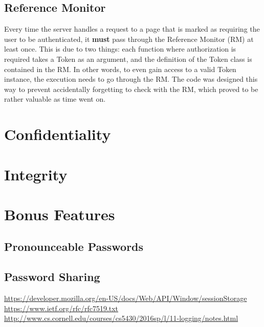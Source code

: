 \documentclass{article}
\begin{document}
\subsection{Reference Monitor}
\par Every time the server handles a request to a page that is marked as requiring the user to be authenticated, it \textbf{must} pass through the Reference Monitor (RM) at least once. This is due to two things: each function where authorization is required takes a Token as an argument, and the definition of the Token class is contained in the RM. In other words, to even gain access to a valid Token instance, the execution needs to go through the RM. The code was designed this way to prevent accidentally forgetting to check with the RM, which proved to be rather valuable as time went on.


\section{Confidentiality}
\section{Integrity}

\section{Bonus Features}

\subsection{Pronounceable Passwords}

\subsection{Password Sharing}

\begin{thebibliography}{30}
    \url{https://developer.mozilla.org/en-US/docs/Web/API/Window/sessionStorage}
    \url{https://www.ietf.org/rfc/rfc7519.txt}
    \url{http://www.cs.cornell.edu/courses/cs5430/2016sp/l/11-logging/notes.html}
\end{thebibliography}
\end{document}
